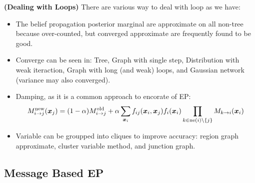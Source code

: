 \begin{remark}{\textbf{(Dealing with Loops)}}
    There are various way to deal with loop as we have:
    \begin{itemize}
        \item The belief propagation posterior marginal are approximate on all non-tree because over-counted, but converged approximate are frequently found to be good. 
        \item Converge can be seen in: Tree, Graph with single step, Distribution with weak iteraction, Graph with long (and weak) loops, and Gaussian network (variance may also converged).
        \item Damping, as it is a common approach to encorate of EP:
        \begin{equation*}
            M^\text{new}_{i\rightarrow j}(\boldsymbol x_j) = (1-\alpha)M^\text{old}_{i\rightarrow j} + \alpha\sum_{\boldsymbol x_i}f_{ij}(\boldsymbol x_i, \boldsymbol x_j)f_i(\boldsymbol x_i) \prod_{k\in\operatorname{ne}(i)\backslash\left\{ j \right\}}M_{k\rightarrow i}(\boldsymbol x_i)
        \end{equation*}
        \item Variable can be groupped into cliques to improve accuracy: region graph approximate, cluster variable method, and junction graph.
    \end{itemize} 
\end{remark}

\subsection{Message Based EP}

